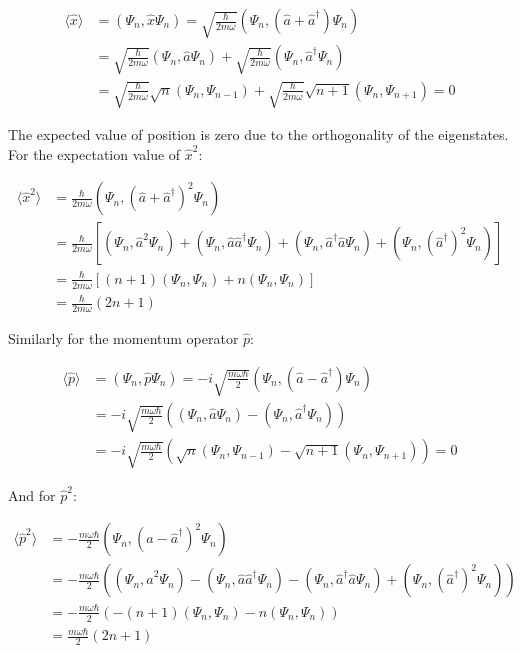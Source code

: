 \documentclass[italian]{HKNdocument}
\begin{document}
\begin{align*}
\langle\hat{x}\rangle &= (\Psi_n, \hat{x}\Psi_n) = \sqrt{\frac{\hbar}{2m\omega}}(\Psi_n, (\hat{a}+\hat{a}^\dagger)\Psi_n) \\
&= \sqrt{\frac{\hbar}{2m\omega}}(\Psi_n, \hat{a}\Psi_n) + \sqrt{\frac{\hbar}{2m\omega}}(\Psi_n, \hat{a}^\dagger\Psi_n) \\
&= \sqrt{\frac{\hbar}{2m\omega}}\sqrt{n}(\Psi_n, \Psi_{n-1}) + \sqrt{\frac{\hbar}{2m\omega}}\sqrt{n+1}(\Psi_n, \Psi_{n+1}) = 0
\end{align*}

The expected value of position is zero due to the orthogonality of the eigenstates. For the expectation value of $\hat{x}^2$:

\begin{align*}
\langle\hat{x}^2\rangle &= \frac{\hbar}{2m\omega}(\Psi_n, (\hat{a}+\hat{a}^\dagger)^2\Psi_n) \\
&= \frac{\hbar}{2m\omega}[(\Psi_n, \hat{a}^2\Psi_n) + (\Psi_n, \hat{a}\hat{a}^\dagger\Psi_n) + (\Psi_n, \hat{a}^\dagger\hat{a}\Psi_n) + (\Psi_n, (\hat{a}^\dagger)^2\Psi_n)] \\
&= \frac{\hbar}{2m\omega}[(n+1)(\Psi_n, \Psi_n) + n(\Psi_n, \Psi_n)] \\
&= \frac{\hbar}{2m\omega}(2n+1) \tag{5.61}
\end{align*}

Similarly for the momentum operator $\hat{p}$:

\begin{align*}
\langle\hat{p}\rangle &= (\Psi_n, \hat{p}\Psi_n) = -i\sqrt{\frac{m\omega\hbar}{2}}(\Psi_n, (\hat{a}-\hat{a}^\dagger)\Psi_n) \\
&= -i\sqrt{\frac{m\omega\hbar}{2}}((\Psi_n, \hat{a}\Psi_n) - (\Psi_n, \hat{a}^\dagger\Psi_n)) \\
&= -i\sqrt{\frac{m\omega\hbar}{2}}(\sqrt{n}(\Psi_n, \Psi_{n-1}) - \sqrt{n+1}(\Psi_n, \Psi_{n+1})) = 0
\end{align*}

And for $\hat{p}^2$:

\begin{align*}
\langle\hat{p}^2\rangle &= -\frac{m\omega\hbar}{2}(\Psi_n, (\hat{a}-\hat{a}^\dagger)^2\Psi_n) \\
&= -\frac{m\omega\hbar}{2}((\Psi_n, \hat{a}^2\Psi_n) - (\Psi_n, \hat{a}\hat{a}^\dagger\Psi_n) - (\Psi_n, \hat{a}^\dagger\hat{a}\Psi_n) + (\Psi_n, (\hat{a}^\dagger)^2\Psi_n)) \\
&= -\frac{m\omega\hbar}{2}(-(n+1)(\Psi_n, \Psi_n) - n(\Psi_n, \Psi_n)) \\
&= \frac{m\omega\hbar}{2}(2n+1) \tag{5.62}
\end{align*}
\end{document}
